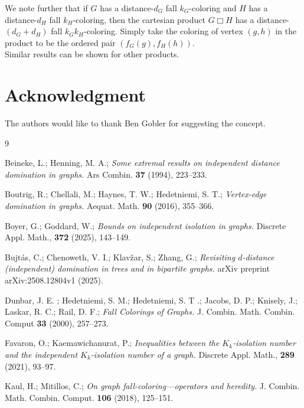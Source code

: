 \documentclass[a4paper,11pt]{article}
\numberwithin{equation}{theorem}
\begin{document}
We note further that if $G$ has a distance-$d_G$ fall $k_G$-coloring and 
$H$ has a distance-$d_H$ fall $k_H$-coloring, then the cartesian product $G \Box H$ has 
a distance-$(d_G+d_H)$ fall $k_G k_H$-coloring. Simply take the coloring of vertex $(g,h)$ in 
the product to be the ordered pair $( f_G(g) , f_H(h) )$.\\
Similar results can be shown for other products.





\section*{Acknowledgment}
The authors would like to thank Ben Gobler for suggesting the concept.





\begin{thebibliography}{9}

Beineke, L.; Henning, M. A.; \textit{Some extremal results on independent distance domination in graphs.} Ars Combin. {\bf 37} (1994), 223--233.

Boutrig, R.; Chellali, M.; Haynes, T. W.; Hedetniemi, S. T.; \textit{Vertex-edge domination in graphs.}
Aequat. Math. {\bf 90} (2016), 355--366.

Boyer, G.; Goddard, W.; \textit{Bounds on independent isolation in graphs.}
Discrete Appl. Math., {\bf 372} (2025), 143--149.

Bujt\'as, C.; Chenoweth, V. I.; Klav\v zar, S.; Zhang, G.; \textit{Revisiting $d$-distance (independent) domination in trees and in bipartite graphs.} arXiv preprint arXiv:2508.12804v1 (2025).

Dunbar, J. E. ; Hedetniemi, S. M.; Hedetniemi, S. T .; Jacobs, D. P.; Knisely, J.; Laskar, R. C.; Rail, D. F.; \textit{Fall Colorings of Graphs.} J. Combin. Math. Combin. Comput {\bf 33} (2000), 257--273.

Favaron, O.; Kaemawichanurat, P.; \textit{Inequalities between the {$K_k$}-isolation number and the
independent {$K_k$}-isolation number of a graph.}
Discrete Appl. Math., {\bf 289} (2021), 93--97.

Kaul, H.; Mitillos, C.; \textit{On graph fall-coloring---operators and heredity.} J. Combin. Math. Combin. Comput. {\bf 106} (2018), 125--151.

\end{thebibliography}
\end{document}
